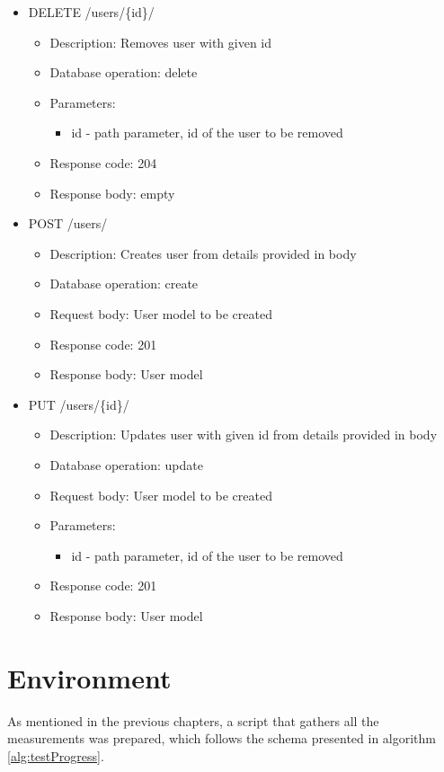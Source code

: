 \begin{itemize}
\begin{itemize}
          \end{itemize}
    \item DELETE /users/\{id\}/
          \begin{itemize}
              \item Description: Removes user with given id
              \item Database operation: delete
              \item Parameters:
                    \begin{itemize}
                        \item id - path parameter, id of the user to be removed
                    \end{itemize}
              \item Response code: 204
              \item Response body: empty
          \end{itemize}
    \item POST /users/
          \begin{itemize}
              \item Description: Creates user from details provided in body
              \item Database operation: create
              \item Request body: User model to be created
              \item Response code: 201
              \item Response body: User model
          \end{itemize}
    \item PUT /users/\{id\}/
          \begin{itemize}
              \item Description: Updates user with given id from details provided in body
              \item Database operation: update
              \item Request body: User model to be created
              \item Parameters:
                    \begin{itemize}
                        \item id - path parameter, id of the user to be removed
                    \end{itemize}
              \item Response code: 201
              \item Response body: User model
          \end{itemize}
\end{itemize}


\section{Environment}

As mentioned in the previous chapters, a script that gathers all the measurements was prepared, which follows the schema presented in algorithm \ref{alg:testProgress}.

